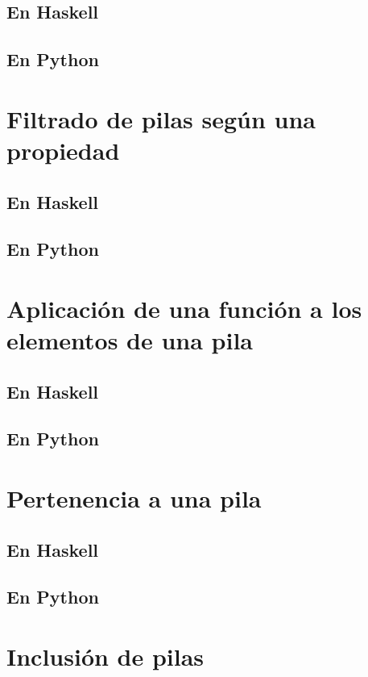 \documentclass[a4paper,12pt,twoside]{book}
\begin{document}
\subsection{En Haskell}
\subsection{En Python}

\section{Filtrado de pilas según una propiedad}
\subsection{En Haskell}
\subsection{En Python}

\section{Aplicación de una función a los elementos de una pila}
\subsection{En Haskell}
\subsection{En Python}

\section{Pertenencia a una pila}
\subsection{En Haskell}
\subsection{En Python}

\section{Inclusión de pilas}
\end{document}
